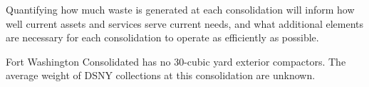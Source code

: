
    Quantifying how much waste is generated at each consolidation will inform how well current assets and services serve current needs, and what additional elements are necessary for each consolidation to operate as efficiently as possible.
    
    Fort Washington Consolidated has no 30-cubic yard exterior compactors. The average weight of DSNY collections at this consolidation are unknown.